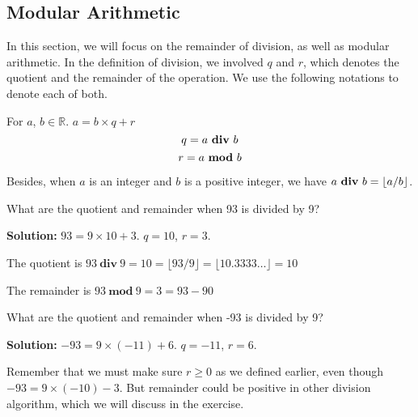     \subsection{Modular Arithmetic}
    In this section, we will focus on the remainder of division, as well as modular arithmetic.
    In the definition of division, we involved $q$ and $r$, which denotes the quotient and
    the remainder of the operation. We use the following notations to denote each of both.
    \begin{notation}
        For $a$, $b\in \mathbb{R}$.
        $a = b\times q + r$    
        $$q = a\ \text{\textbf{div}}\ b$$
        $$r = a\ \text{\textbf{mod}}\ b$$
    \end{notation}
    Besides, when $a$ is an integer and $b$ is a positive integer, we have $a\ \text{\textbf{div}}\ b = \left \lfloor  a/b \right \rfloor$.
    \begin{example}
        What are the quotient and remainder when 93 is divided by 9?
    \end{example}
    \textbf{Solution:} $93 = 9\times 10 + 3$. $q = 10$, $r = 3$.

    The quotient is $93\ \textbf{div}\ 9 = 10 = \lfloor93/9\rfloor = \lfloor10.3333\dots \rfloor = 10$

    The remainder is $93\ \textbf{mod}\ 9 = 3 = 93 - 90$
    
    \begin{example}
        What are the quotient and remainder when -93 is divided by 9?
    \end{example}
    \textbf{Solution:} $-93 = 9\times (-11) + 6$. $q = -11$, $r = 6$.
    
    Remember that we must make sure $r\geq0$ as we defined earlier, even though $-93 = 9\times(-10) - 3$.
    But remainder could be positive in other division algorithm, which we will discuss in the exercise.

